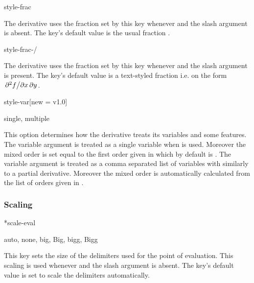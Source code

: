 	\begin{option}{style-frac}
		\begin{values}[default = \cs{frac}]
		\end{values}
		The derivative uses the fraction set by this key whenever  and the slash argument is absent. The key's default value is the usual fraction .
	\end{option}
	
	\begin{option}{style-frac-/}
		\begin{values}[default = \cs{slashfrac}]
		\end{values}
		The derivative uses the fraction set by this key whenever  and the slash argument is present. The key's default value is a text-styled fraction  i.e. on the form $\pdv[style-frac-/=\slashfrac, switch-/=false]{f}/{x,y}$.
	\end{option}
	
	\clearpage
	
	\begin{option}{style-var}[new = v1.0]
		\begin{values}[default = single]
			single, multiple
		\end{values}
		This option determines how the derivative treats its variables and some features. The variable argument is treated as a single variable when  is used. Moreover the mixed order is set equal to the first order given in  which by default is . The variable argument is treated as a comma separated list of variables with  similarly to a partial derivative. Moreover the mixed order is automatically calculated from the list of orders given in .
	\end{option}
	
	\subsubsection*{Scaling}
	
	\begin{option}*{scale-eval}
		\begin{values}[default = auto]
			auto, none, big, Big, bigg, Bigg
		\end{values}
		This key sets the size of the delimiters used for the point of evaluation. This scaling is used whenever  and the slash argument is absent. The key's default value is set to scale the delimiters automatically.
	\end{option}
	
